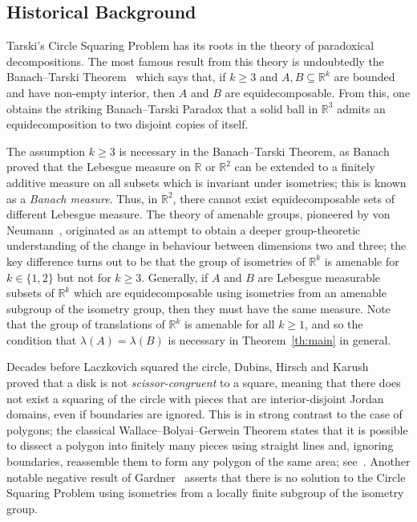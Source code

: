 \documentclass[12pt,a4paper]{amsart}
\numberwithin{equation}{section}
\theoremstyle{definition}
\begin{document}
\subsection{Historical Background}

Tarski's Circle Squaring Problem has its roots in the theory of paradoxical decompositions. The most famous result from this theory is undoubtedly the Banach--Tarski Theorem~\cite{BanachTarski24} which says that, if $k\geq3$ and $A,B\subseteq \mathbb{R}^k$ are bounded and have non-empty interior, then $A$ and $B$ are equidecomposable. From this, one obtains the striking Banach--Tarski Paradox that a solid ball in $\mathbb{R}^3$ admits an equidecomposition to two disjoint copies of itself. 

The assumption $k\geq3$ is necessary in the Banach--Tarski Theorem, as Banach~\cite{Banach23} proved that the Lebesgue measure on $\mathbb{R}$ or $\mathbb{R}^2$ can be extended to a finitely additive measure on all subsets which is invariant under isometries; this is known as a \emph{Banach measure}. Thus, in $\mathbb{R}^2$, there cannot exist equidecomposable sets of different Lebesgue measure. The theory of amenable groups, pioneered by von Neumann~\cite{Neumann29}, originated as an attempt to obtain a deeper group-theoretic understanding of the change in behaviour between dimensions two and three; the key difference turns out to be that the group of isometries of $\mathbb{R}^k$ is amenable for $k\in\{1,2\}$ but not for $k\geq 3$. Generally, if $A$ and $B$ are Lebesgue measurable subsets of $\mathbb{R}^k$ which are equidecomposable using isometries from an amenable subgroup of the isometry group, then they must have the same measure. Note that the group of translations of $\mathbb{R}^k$ is amenable for all $k\geq1$, and so the condition that $\lambda(A)=\lambda(B)$ is necessary in Theorem~\ref{th:main} in general.

Decades before Laczkovich squared the circle, Dubins, Hirsch and Karush~\cite{DubinsHirschKarush63} proved that a disk is not \emph{scissor-congruent} to a square, meaning that there does not exist a squaring of the circle with pieces that are interior-disjoint Jordan domains, even if boundaries are ignored. This is in strong contrast to the case of polygons; the classical Wallace--Bolyai--Gerwein Theorem states that it is possible to dissect a polygon into finitely many pieces using straight lines and, ignoring boundaries, reassemble them to form any polygon of the same area; see~\cite[pp.~34--35]{TomkowiczWagon16}. Another notable negative result of Gardner~\cite{Gardner85} asserts that there is no solution to the Circle Squaring Problem using isometries from a locally finite subgroup of the isometry group.
\end{document}
